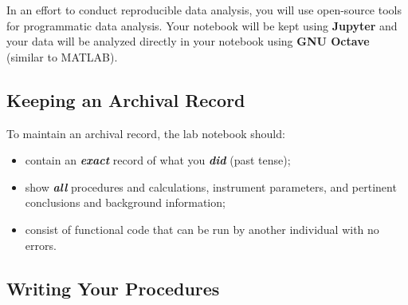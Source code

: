 \documentclass[]{tufte-book}
\providecommand{\tightlist}{%
  \setlength{\itemsep}{0pt}\setlength{\parskip}{0pt}}
\begin{document}
In an effort to conduct reproducible data analysis, you will use open-source tools for programmatic data analysis. Your notebook will be kept using \textbf{Jupyter} and your data will be analyzed directly in your notebook using \textbf{GNU Octave} (similar to MATLAB).

\hypertarget{keeping-an-archival-record}{%
\subsection*{Keeping an Archival Record}\label{keeping-an-archival-record}}

To maintain an archival record, the lab notebook should:

\begin{itemize}
\tightlist
\item
  contain an \textbf{\emph{exact}} record of what you \textbf{\emph{did}} (past tense);
\item
  show \textbf{\emph{all}} procedures and calculations, instrument parameters, and pertinent conclusions and background information;
\item
  consist of functional code that can be run by another individual with no errors.
\end{itemize}

\hypertarget{writing-your-procedures}{%
\subsection*{Writing Your Procedures}\label{writing-your-procedures}}
\end{document}
